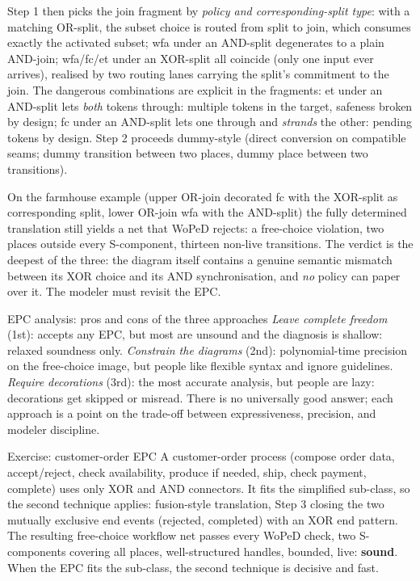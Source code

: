 Step 1 then picks the join fragment by \emph{policy and corresponding-split type}: with a matching OR-split, the subset choice is routed from split to join, which consumes exactly the activated subset; \textsf{wfa} under an AND-split degenerates to a plain AND-join; \textsf{wfa}/\textsf{fc}/\textsf{et} under an XOR-split all coincide (only one input ever arrives), realised by two routing lanes carrying the split's commitment to the join. The dangerous combinations are explicit in the fragments: \textsf{et} under an AND-split lets \emph{both} tokens through: multiple tokens in the target, safeness broken by design; \textsf{fc} under an AND-split lets one through and \emph{strands} the other: pending tokens by design. Step 2 proceeds dummy-style (direct conversion on compatible seams; dummy transition between two places, dummy place between two transitions).

On the farmhouse example (upper OR-join decorated \textsf{fc} with the XOR-split as corresponding split, lower OR-join \textsf{wfa} with the AND-split) the fully determined translation still yields a net that WoPeD rejects: a free-choice violation, two places outside every S-component, thirteen non-live transitions. The verdict is the deepest of the three: the diagram itself contains a genuine semantic mismatch between its XOR choice and its AND synchronisation, and \emph{no} policy can paper over it. The modeler must revisit the EPC.

\begin{notebox}{EPC analysis: pros and cons of the three approaches}
\emph{Leave complete freedom} (1st): accepts any EPC, but most are unsound and the diagnosis is shallow: relaxed soundness only. \emph{Constrain the diagrams} (2nd): polynomial-time precision on the free-choice image, but people like flexible syntax and ignore guidelines. \emph{Require decorations} (3rd): the most accurate analysis, but people are lazy: decorations get skipped or misread. There is no universally good answer; each approach is a point on the trade-off between expressiveness, precision, and modeler discipline.
\end{notebox}

\begin{examplebox}{Exercise: customer-order EPC}
A customer-order process (compose order data, accept/reject, check availability, produce if needed, ship, check payment, complete) uses only XOR and AND connectors. It fits the simplified sub-class, so the second technique applies: fusion-style translation, Step 3 closing the two mutually exclusive end events (\textsf{rejected}, \textsf{completed}) with an XOR end pattern. The resulting free-choice workflow net passes every WoPeD check, two S-components covering all places, well-structured handles, bounded, live: \textbf{sound}. When the EPC fits the sub-class, the second technique is decisive and fast.
\end{examplebox}
